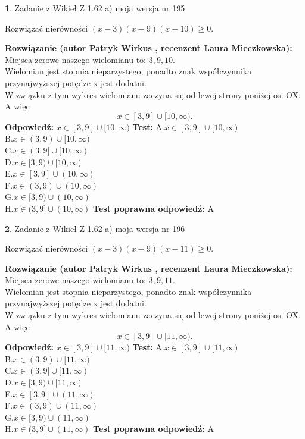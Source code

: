 \documentclass[12pt, a4paper]{article}
\theoremstyle{definition} %
\newtheorem{zad}{}
\newcommand{\zadStart}[1]{\begin{zad}#1\newline}
\newcommand{\zadStop}{\end{zad}}
\newcommand{\rozwStart}[2]{\noindent \textbf{Rozwiązanie (autor #1 , recenzent #2): }\newline}
\newcommand{\rozwStop}{\newline}
\newcommand{\odpStart}{\noindent \textbf{Odpowiedź:}\newline}
\newcommand{\odpStop}{\newline}
\newcommand{\testStart}{\noindent \textbf{Test:}\newline}
\newcommand{\testStop}{\newline}
\newcommand{\kluczStart}{\noindent \textbf{Test poprawna odpowiedź:}\newline}
\newcommand{\kluczStop}{\newline}
\begin{document}
\zadStart{Zadanie z Wikieł Z 1.62 a) moja wersja nr 195}

Rozwiązać nierówności $(x-3)(x-9)(x-10)\ge0$.
\zadStop
\rozwStart{Patryk Wirkus}{Laura Mieczkowska}
Miejsca zerowe naszego wielomianu to: $3, 9, 10$.\\
Wielomian jest stopnia nieparzystego, ponadto znak współczynnika przy\linebreak najwyższej potędze x jest dodatni.\\ W związku z tym wykres wielomianu zaczyna się od lewej strony poniżej osi OX. A więc $$x \in [3,9] \cup [10,\infty).$$
\rozwStop
\odpStart
$x \in [3,9] \cup [10,\infty)$
\odpStop
\testStart
A.$x \in [3,9] \cup [10,\infty)$\\
B.$x \in (3,9) \cup [10,\infty)$\\
C.$x \in (3,9] \cup [10,\infty)$\\
D.$x \in [3,9) \cup [10,\infty)$\\
E.$x \in [3,9] \cup (10,\infty)$\\
F.$x \in (3,9) \cup (10,\infty)$\\
G.$x \in [3,9) \cup (10,\infty)$\\
H.$x \in (3,9] \cup (10,\infty)$
\testStop
\kluczStart
A
\kluczStop



\zadStart{Zadanie z Wikieł Z 1.62 a) moja wersja nr 196}

Rozwiązać nierówności $(x-3)(x-9)(x-11)\ge0$.
\zadStop
\rozwStart{Patryk Wirkus}{Laura Mieczkowska}
Miejsca zerowe naszego wielomianu to: $3, 9, 11$.\\
Wielomian jest stopnia nieparzystego, ponadto znak współczynnika przy\linebreak najwyższej potędze x jest dodatni.\\ W związku z tym wykres wielomianu zaczyna się od lewej strony poniżej osi OX. A więc $$x \in [3,9] \cup [11,\infty).$$
\rozwStop
\odpStart
$x \in [3,9] \cup [11,\infty)$
\odpStop
\testStart
A.$x \in [3,9] \cup [11,\infty)$\\
B.$x \in (3,9) \cup [11,\infty)$\\
C.$x \in (3,9] \cup [11,\infty)$\\
D.$x \in [3,9) \cup [11,\infty)$\\
E.$x \in [3,9] \cup (11,\infty)$\\
F.$x \in (3,9) \cup (11,\infty)$\\
G.$x \in [3,9) \cup (11,\infty)$\\
H.$x \in (3,9] \cup (11,\infty)$
\testStop
\kluczStart
A
\kluczStop
\end{document}
